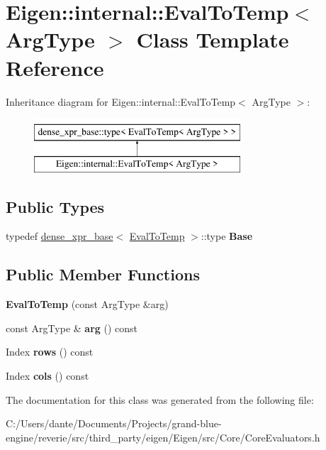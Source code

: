 \hypertarget{class_eigen_1_1internal_1_1_eval_to_temp}{}\section{Eigen\+::internal\+::Eval\+To\+Temp$<$ Arg\+Type $>$ Class Template Reference}
\label{class_eigen_1_1internal_1_1_eval_to_temp}
Inheritance diagram for Eigen\+::internal\+::Eval\+To\+Temp$<$ Arg\+Type $>$\+:\begin{figure}[H]
\begin{center}
\leavevmode
\includegraphics[height=2.000000cm]{class_eigen_1_1internal_1_1_eval_to_temp}
\end{center}
\end{figure}
\subsection*{Public Types}
\begin{DoxyCompactItemize}
\item 
\mbox{\label{class_eigen_1_1internal_1_1_eval_to_temp_a087cbd9b48266c6ce096ae8c38b39458}} 
typedef \mbox{\hyperlink{struct_eigen_1_1internal_1_1dense__xpr__base}{dense\+\_\+xpr\+\_\+base}}$<$ \mbox{\hyperlink{class_eigen_1_1internal_1_1_eval_to_temp}{Eval\+To\+Temp}} $>$\+::type {\bfseries Base}
\end{DoxyCompactItemize}
\subsection*{Public Member Functions}
\begin{DoxyCompactItemize}
\item 
\mbox{\label{class_eigen_1_1internal_1_1_eval_to_temp_ad1dcc1133361c8fe6dee2dca185c811a}} 
{\bfseries Eval\+To\+Temp} (const Arg\+Type \&arg)
\item 
\mbox{\label{class_eigen_1_1internal_1_1_eval_to_temp_af2869825a51446187011b024caf7b6b0}} 
const Arg\+Type \& {\bfseries arg} () const
\item 
\mbox{\label{class_eigen_1_1internal_1_1_eval_to_temp_a5c165e0ad1edb24f8e07f65138345544}} 
Index {\bfseries rows} () const
\item 
\mbox{\label{class_eigen_1_1internal_1_1_eval_to_temp_aa2fdcb7ecd2a8591d48fd0ce6b6fbb03}} 
Index {\bfseries cols} () const
\end{DoxyCompactItemize}


The documentation for this class was generated from the following file\+:\begin{DoxyCompactItemize}
\item 
C\+:/\+Users/dante/\+Documents/\+Projects/grand-\/blue-\/engine/reverie/src/third\+\_\+party/eigen/\+Eigen/src/\+Core/Core\+Evaluators.\+h\end{DoxyCompactItemize}
